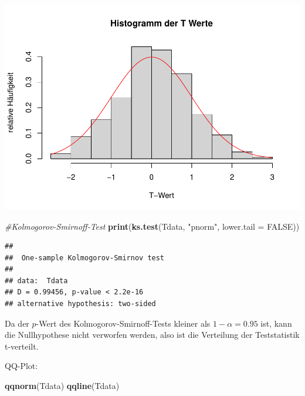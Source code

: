 \documentclass[]{article}
\newenvironment{Shaded}{\begin{snugshade}}{\end{snugshade}}
\newcommand{\CommentTok}[1]{\textcolor[rgb]{0.56,0.35,0.01}{\textit{#1}}}
\newcommand{\DataTypeTok}[1]{\textcolor[rgb]{0.13,0.29,0.53}{#1}}
\newcommand{\KeywordTok}[1]{\textcolor[rgb]{0.13,0.29,0.53}{\textbf{#1}}}
\newcommand{\NormalTok}[1]{#1}
\newcommand{\OtherTok}[1]{\textcolor[rgb]{0.56,0.35,0.01}{#1}}
\newcommand{\StringTok}[1]{\textcolor[rgb]{0.31,0.60,0.02}{#1}}
\begin{document}
\includegraphics{BelaSchinkeAusarbeitung_files/figure-latex/unnamed-chunk-9-1.pdf}

\begin{Shaded}
\begin{Highlighting}[]
\CommentTok{#Kolmogorov-Smirnoff-Test}
\KeywordTok{print}\NormalTok{(}\KeywordTok{ks.test}\NormalTok{(Tdata, }\StringTok{"pnorm"}\NormalTok{, }\DataTypeTok{lower.tail =} \OtherTok{FALSE}\NormalTok{))}
\end{Highlighting}
\end{Shaded}

\begin{verbatim}
## 
##  One-sample Kolmogorov-Smirnov test
## 
## data:  Tdata
## D = 0.99456, p-value < 2.2e-16
## alternative hypothesis: two-sided
\end{verbatim}

Da der \(p\)-Wert des Kolmogorov-Smirnoff-Tests kleiner als \(1-\alpha=0.95\) ist, kann die Nullhypothese nicht verworfen werden,
also ist die Verteilung der Teststatistik t-verteilt.

QQ-Plot:

\begin{Shaded}
\begin{Highlighting}[]
\KeywordTok{qqnorm}\NormalTok{(Tdata)}
\KeywordTok{qqline}\NormalTok{(Tdata)}
\end{Highlighting}
\end{Shaded}
\end{document}
